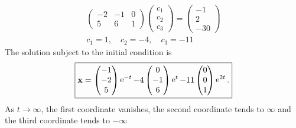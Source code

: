 {\begin{Solution}
\begin{gather*}
\begin{pmatrix}
      -2 & -1 & 0 \\
      5 & 6 & 1
    \end{pmatrix}
    \begin{pmatrix}
      c_1 \\
      c_2 \\
      c_3
    \end{pmatrix}
    =
    \begin{pmatrix}
      -1 \\
      2 \\
      -30
    \end{pmatrix} \\
    c_1 = 1, \quad c_2 = -4, \quad c_3 = -11
  \end{gather*}
  The solution subject to the initial condition is
  \[
  \boxed{
    \mathbf{x} = 
    \begin{pmatrix} -1 \\ -2 \\ 5 \end{pmatrix} \mathop{\mathrm{e}}\nolimits^{-t}
    -4 \begin{pmatrix} 0 \\ -1 \\ 6 \end{pmatrix} \mathop{\mathrm{e}}\nolimits^t
    -11 \begin{pmatrix} 0 \\ 0 \\ 1 \end{pmatrix} \mathop{\mathrm{e}}\nolimits^{2 t}.
    }
  \]
  As $t \to \infty$, the first coordinate vanishes,
  the second coordinate tends to $\infty$
  and the third coordinate tends to $-\infty$



\end{Solution}}
